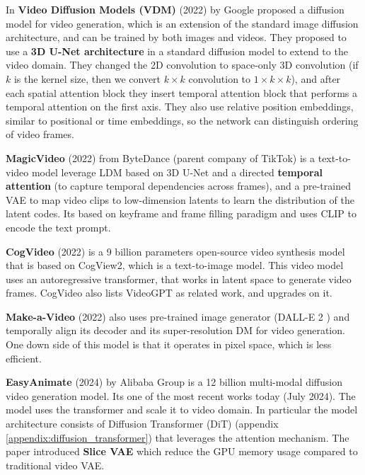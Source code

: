 In \textbf{Video Diffusion Models (VDM)} \cite{video_diffusion_models} (2022) by Google proposed a diffusion model for video generation, which is an extension of the standard image diffusion architecture, and can be trained by both images and videos. They proposed to use a \textbf{3D U-Net architecture} in a standard diffusion model to extend to the video domain. They changed the 2D convolution to space-only 3D convolution (if $k$ is the kernel size, then we convert $k\times k$ convolution to $1\times k\times k$), and after each spatial attention block they insert temporal attention block that performs a temporal attention on the first axis. They also use relative position embeddings, similar to positional or time embeddings, so the network can distinguish ordering of video frames.

\textbf{MagicVideo} (2022) \cite{magic_video} from ByteDance (parent company of TikTok) is a text-to-video model leverage LDM based on 3D U-Net and a directed \textbf{temporal attention} (to capture temporal dependencies across frames), and a pre-trained VAE to map video clips to low-dimension latents to learn the distribution of the latent codes. Its based on keyframe and frame filling paradigm and uses CLIP to encode the text prompt.

\textbf{CogVideo} (2022) \cite{cogvideo} is a 9 billion parameters open-source video synthesis model that is based on CogView2, which is a text-to-image model. This video model uses an autoregressive transformer, that works in latent space to generate video frames. CogVideo also lists VideoGPT as related work, and upgrades on it.

\textbf{Make-a-Video} (2022) \cite{make_a_video} also uses pre-trained image generator (DALL-E 2 \cite{dalle_2}) and temporally align its decoder and its super-resolution DM for video generation. One down side of this model is that it operates in pixel space, which is less efficient.

\textbf{EasyAnimate} (2024) \cite{easyanimate} by Alibaba Group is a 12 billion multi-modal diffusion video generation model. Its one of the most recent works today (July 2024). The model uses the transformer and scale it to video domain. In particular the model architecture consists of Diffusion Transformer (DiT) (appendix \ref{appendix:diffusion_transformer}) that leverages the attention mechanism. The paper introduced \textbf{Slice VAE} which reduce the GPU memory usage compared to traditional video VAE.

